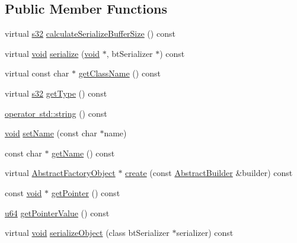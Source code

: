 \subsection*{Public Member Functions}
\begin{DoxyCompactItemize}
\item 
virtual \mbox{\hyperlink{_util_8h_aa62c75d314a0d1f37f79c4b73b2292e2}{s32}} \mbox{\hyperlink{classnjli_1_1_xml_a369cf0f26ac1c8e18faafca9e66e60bc}{calculate\+Serialize\+Buffer\+Size}} () const
\item 
virtual \mbox{\hyperlink{_thread_8h_af1e856da2e658414cb2456cb6f7ebc66}{void}} \mbox{\hyperlink{classnjli_1_1_xml_a02b1771a550fcb07c7f0e887033dd7e4}{serialize}} (\mbox{\hyperlink{_thread_8h_af1e856da2e658414cb2456cb6f7ebc66}{void}} $\ast$, bt\+Serializer $\ast$) const
\item 
virtual const char $\ast$ \mbox{\hyperlink{classnjli_1_1_xml_abc7ce0d0b196b029860dc0ef23b452ac}{get\+Class\+Name}} () const
\item 
virtual \mbox{\hyperlink{_util_8h_aa62c75d314a0d1f37f79c4b73b2292e2}{s32}} \mbox{\hyperlink{classnjli_1_1_xml_a45d39d1ce5352ecd046a4bc2ab44895c}{get\+Type}} () const
\item 
\mbox{\hyperlink{classnjli_1_1_xml_ad48a08ea1d2977ea2da45afc3e04d78d}{operator std\+::string}} () const
\item 
\mbox{\hyperlink{_thread_8h_af1e856da2e658414cb2456cb6f7ebc66}{void}} \mbox{\hyperlink{classnjli_1_1_xml_a087eb5f8d9f51cc476f12f1d10a3cb95}{set\+Name}} (const char $\ast$name)
\item 
const char $\ast$ \mbox{\hyperlink{classnjli_1_1_xml_ad41266885be835f3ee602311e20877a4}{get\+Name}} () const
\item 
virtual \mbox{\hyperlink{classnjli_1_1_abstract_factory_object}{Abstract\+Factory\+Object}} $\ast$ \mbox{\hyperlink{classnjli_1_1_xml_a83a8876ae63b92804004cf3febe76573}{create}} (const \mbox{\hyperlink{classnjli_1_1_abstract_builder}{Abstract\+Builder}} \&builder) const
\item 
const \mbox{\hyperlink{_thread_8h_af1e856da2e658414cb2456cb6f7ebc66}{void}} $\ast$ \mbox{\hyperlink{classnjli_1_1_xml_ac4ca71716ed832be357f15f8262c8448}{get\+Pointer}} () const
\item 
\mbox{\hyperlink{_util_8h_ad758b7a5c3f18ed79d2fcd23d9f16357}{u64}} \mbox{\hyperlink{classnjli_1_1_xml_a4ffddf141a426a5a07d0ac19f1913811}{get\+Pointer\+Value}} () const
\item 
virtual \mbox{\hyperlink{_thread_8h_af1e856da2e658414cb2456cb6f7ebc66}{void}} \mbox{\hyperlink{classnjli_1_1_xml_a4fc4bcd9d1930911474210c047372fc0}{serialize\+Object}} (class bt\+Serializer $\ast$serializer) const
\end{DoxyCompactItemize}
